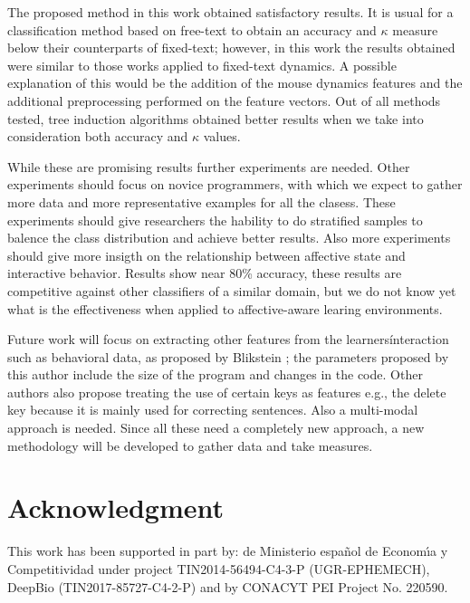 \documentclass[a4paper,twoside]{article}
\begin{document}
The proposed method in this work obtained
satisfactory results. It is usual for a classification method based on free-text
to obtain an accuracy and $\kappa$ measure below their counterparts of
fixed-text; however, in this
work the results obtained were similar to those works applied to fixed-text
dynamics. A possible explanation of this would be the addition of the mouse
dynamics features and the additional preprocessing performed on the
feature vectors.  Out of all methods tested, tree induction algorithms
obtained better results when we take into consideration both accuracy and  $\kappa$ values.

While these are promising results further experiments are
needed. Other experiments should focus on novice programmers, with
which we expect to gather more data and more representative examples for all the
clasess. These experiments should give researchers the hability to do stratified samples to balence
the class distribution and achieve better results. Also more experiments should
give more insigth on the relationship between affective state  and interactive
behavior. Results show near 80\% accuracy, these results  are competitive
against other classifiers of a similar domain, but we do not know yet what is
the effectiveness when applied to affective-aware learing environments.   

Future work will focus on extracting other features from the learners\' interaction such as behavioral data, as proposed by Blikstein
\cite{blikstein2011using}; the parameters proposed by this author
include the size of the program and changes in the code. Other authors
also propose treating the use of certain keys as features e.g., the
delete key because it is mainly used for correcting sentences. Also a multi-modal approach is needed. Since all these need a completely new approach, a new methodology will be developed to
gather data and take measures.

\section*{Acknowledgment}
This work has been supported in part by: de Ministerio espa\~{n}ol de
Econom\'{\i}a y Competitividad under project TIN2014-56494-C4-3-P
(UGR-EPHEMECH),  DeepBio (TIN2017-85727-C4-2-P) and by CONACYT PEI Project No. 220590.




\vfill
\end{document}
